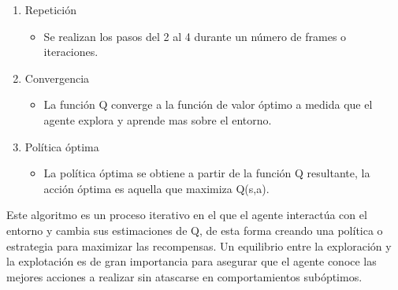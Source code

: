 \begin{enumerate}
	\item Repetición
		\begin{itemize}
			\item Se realizan los pasos del 2 al 4 durante un número de frames o iteraciones.
		\end{itemize}

	\item Convergencia
		\begin{itemize}
			\item La función Q converge a la función de valor óptimo a medida que el agente explora 	y aprende mas sobre el entorno.
		\end{itemize}

	\item Política óptima
		\begin{itemize}
			\item La política óptima se obtiene a partir de la función Q resultante, la acción 	óptima es aquella que maximiza Q(s,a).
		\end{itemize}
\end{enumerate}
Este algoritmo es un proceso iterativo en el que el agente interactúa con el entorno y cambia sus estimaciones de Q, de esta forma creando una política o estrategia para maximizar las recompensas. Un equilibrio entre la exploración y la explotación es de gran importancia para asegurar que el agente conoce las mejores acciones a realizar sin atascarse en comportamientos subóptimos.
